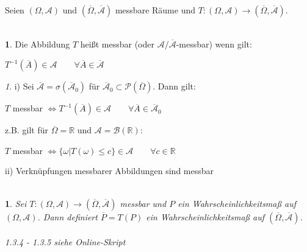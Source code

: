 \documentclass[10pt,a4paper]{report}
\numberwithin{equation}{section}
\numberwithin{figure}{section}
\theoremstyle{plain}
\theoremstyle{definition}
\newtheorem{defn}{\protect\definitionname}[section]
\theoremstyle{plain}
\newtheorem{prop}{\protect\propositionname}[section]
\theoremstyle{definition}
\theoremstyle{remark}
\newtheorem{rem}{\protect\remarkname}[section]
\theoremstyle{plain}
\theoremstyle{plain}
\theoremstyle{plain}
\theoremstyle{plain}
\theoremstyle{plain}
\providecommand{\definitionname}{Definition}
\providecommand{\propositionname}{Satz}
\providecommand{\remarkname}{Bemerkung}
\newcommand{\1}{ \mathbb{1} } %
\begin{document}
Seien $(\Omega, \mathcal{A})$ und $(\overline{\Omega},\overline{\mathcal{A}})$ messbare Räume und $T: (\Omega, \mathcal{A}) \to (\overline{\Omega},\overline{\mathcal{A}})$.\\\\
\begin{defn}
  Die Abbildung $T$ heißt messbar (oder
  $\mathcal{A}/\overline{\mathcal{A}}$-messbar) wenn gilt:
  \begin{center}
    $T^{-1}(\overline{A}) \in \mathcal{A} \qquad \forall \overline{A}
    \in \overline{\mathcal{A}}$
  \end{center}
\end{defn}
\begin{rem}
  i) Sei $\overline{\mathcal{A}}=\sigma(\overline{\mathcal{A}}_0)$ für
  $\overline{\mathcal{A}}_0 \subset
  \mathcal{P}(\overline{\Omega})$. Dann gilt:
  \begin{center}
    $T$ messbar $\Leftrightarrow T^{-1}(\overline{A}) \in \mathcal{A}
    \qquad \forall \overline{A} \in \overline{\mathcal{A}}_0$
  \end{center}
  z.B. gilt für $\overline{\Omega}=\mathbb{R}$ und
  $\mathcal{A}=\mathcal{B}(\mathbb{R})$:
  \begin{center}
    $T$ messbar $\Leftrightarrow \{\omega|T(\omega)\leq c\} \in
    \mathcal{A} \qquad \forall c \in \mathbb{R}$
  \end{center}
  ii) Verknüpfungen messbarer Abbildungen sind messbar\\\\
\end{rem}
\begin{prop}
  Sei $T:(\Omega, \mathcal{A})\to(\overline{\Omega},\overline{\mathcal{A}})$ messbar und $P$ ein Wahrscheinlichkeitsmaß auf $(\Omega, \mathcal{A})$. Dann definiert $\overline{P}=T(P)$ ein Wahrscheinlichkeitsmaß auf $(\overline{\Omega},\overline{\mathcal{A}})$.\\\\
  1.3.4 - 1.3.5 siehe Online-Skript\\\\
\end{prop}
\end{document}
